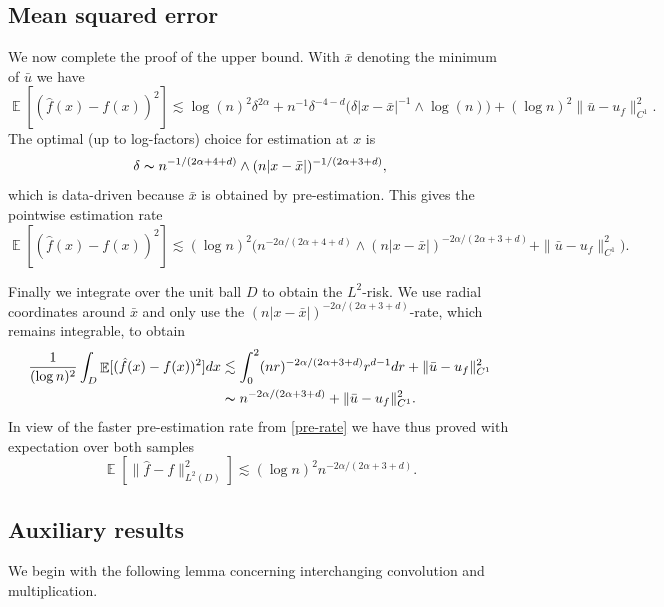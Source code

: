 \documentclass{article}
\numberwithin{equation}{section}
\theoremstyle{definition}
\DeclareMathOperator{\E}{{\mathbb E}}
\providecommand{\abs}[1]{\lvert #1 \rvert}
\begin{document}
\subsection{Mean squared error}
We now complete the proof of the upper bound. With $\bar x$ denoting the minimum of $\bar u$ we have
\[ \E[(\hat f (x)-f(x))^2]\lesssim \log(n)^2 \delta^{2\alpha}+n^{-1}\delta^{-4-d}\big(\delta\abs{x-\bar x}^{-1}\wedge\log(n)\big) + (\log n)^2\|\bar u- u_f\|_{C^1}^2.\]
The optimal (up to log-factors) choice for estimation at $x$ is
\[\delta\thicksim n^{-1/(2\alpha+4+d)}\wedge (n\abs{x-\bar x})^{-1/(2\alpha+3+d)},\]
which is data-driven because $\bar x$ is obtained by pre-estimation. This gives the  pointwise estimation rate
\[ \E[(\hat f(x)-f(x))^2]\lesssim (\log n)^2 \big( n^{-2\alpha/(2\alpha+4+d)}\wedge (n\abs{x-\bar x})^{-2\alpha/(2\alpha+3+d)} + \|\bar u- u_f\|_{C^1}^2\big).\]

Finally we integrate over the unit ball $D$ to obtain the $L^2$-risk. We use radial coordinates around $\bar x$ and only use the $(n\abs{x-\bar x})^{-2\alpha/(2\alpha+3+d)}$-rate, which remains integrable, to obtain
\begin{align*}
 \frac {1}{(\log n)^2}\int_D\E[(\hat f(x)-f(x))^2]dx &\lesssim \int_0^2 (nr)^{-2\alpha/(2\alpha+3+d)}r^{d-1}dr+\|\bar u- u_f\|_{C^1}^2 \\
&\thicksim n^{-2\alpha/(2\alpha+3+d)}+\|\bar u- u_f\|_{C^1}^2.
 \end{align*}
In view of the faster pre-estimation rate from \eqref{pre-rate} we have thus proved with expectation over both samples
\begin{equation*}
\boxed{
\E[\| \hat f -f \|_{L^2(D)}^2]\lesssim (\log n)^2 n^{-2\alpha/(2\alpha+3+d)}.}
\end{equation*}

\subsection{Auxiliary results}


We begin with the following lemma concerning interchanging convolution and multiplication. 
\end{document}
